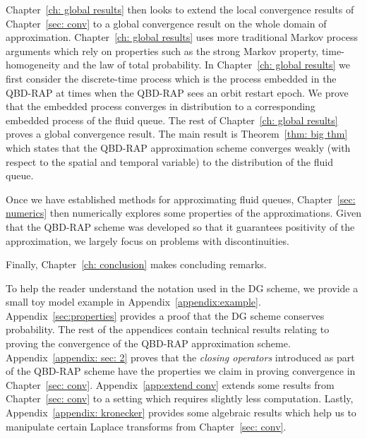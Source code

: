 Chapter~\ref{ch: global results} then looks to extend the local convergence results of Chapter~\ref{sec: conv} to a global convergence result on the whole domain of approximation. Chapter~\ref{ch: global results} uses more traditional Markov process arguments which rely on properties such as the strong Markov property, time-homogeneity and the law of total probability. In Chapter~\ref{ch: global results} we first consider the discrete-time process which is the process embedded in the QBD-RAP at times when the QBD-RAP sees an orbit restart epoch. We prove that the embedded process converges in distribution to a corresponding embedded process of the fluid queue. The rest of Chapter~\ref{ch: global results} proves a global convergence result. The main result is Theorem~\ref{thm: big thm} which states that the QBD-RAP approximation scheme converges weakly (with respect to the spatial and temporal variable) to the distribution of the fluid queue. 

Once we have established methods for approximating fluid queues, Chapter~\ref{sec: numerics} then numerically explores some properties of the approximations. Given that the QBD-RAP scheme was developed so that it guarantees positivity of the approximation, we largely focus on problems with discontinuities. 

Finally, Chapter~\ref{ch: conclusion} makes concluding remarks. 

To help the reader understand the notation used in the DG scheme, we provide a small toy model example in Appendix~\ref{appendix:example}. Appendix~\ref{sec:properties} provides a proof that the DG scheme conserves probability. The rest of the appendices contain technical results relating to proving the convergence of the QBD-RAP approximation scheme. Appendix~\ref{appendix: sec: 2} proves that the \emph{closing operators} introduced as part of the QBD-RAP scheme have the properties we claim in proving convergence in Chapter~\ref{sec: conv}. Appendix~\ref{app:extend conv} extends some results from Chapter~\ref{sec: conv} to a setting which requires slightly less computation. Lastly, Appendix~\ref{appendix: kronecker} provides some algebraic results which help us to manipulate certain Laplace transforms from Chapter~\ref{sec: conv}.

